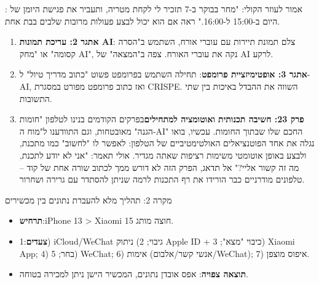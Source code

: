 \begin{tcbpractice}{: אמור לעוזר הקולי: "מחר בבוקר ב-7 תזכיר לי לקחת מטריה, ותעביר את פגישת היומן של היום ב-15:00 ל-16:00." ראה אם הוא יכול לבצע פעולות מרובות שלבים בבת אחת.}
\begin{enumerate}
  \item \textbf{אתגר 2: עריכת תמונות AI}: צלם תמונת תיירות עם עוברי אורח, השתמש ב"הסרה קסומה" או "מחק AI", נקה את עוברי האורח. צפה ב"המצאה" של AI לרקע.
  \item \textbf{אתגר 3: אופטימיזציית פרומפט}: תחילה השתמש בפרומפט פשוט "כתוב מדריך טיול" ל-AI, ואז כתוב פרומפט מפורט במסגרת CRISPE. השווה את ההבדל באיכות בין שתי התשובות.
  \item \textbf{פרק 23: חשיבה תכנותית ואוטומציה למתחילים}בפרקים הקודמים בנינו לטלפון "חומות הגנה" מאובטחות, וגם התוודענו ל"מוח ה-AI" החכם שלו שבתוך החומות. עכשיו, בואו נגלה את אחד הפוטנציאלים האולטימטיביים של הטלפון: לאפשר לו "לחשוב" כמו מתכנת, ולבצע באופן אוטומטי משימות רציפות שאתה מגדיר. אולי תאמר: "אני לא יודע לתכנת, מה זה קשור אליי?" אל תדאג, הפרק הזה לא דורש ממך לכתוב שורה אחת של קוד – טלפונים מודרניים כבר הורידו את רף התכנות לרמה שניתן להסתדר עם גרירה ושחרור.
\end{enumerate}

\end{tcbpractice}

\begin{tcbinfo}{מקרה 2: תהליך מלא להעברת נתונים בין מכשירים}
\begin{itemize}
  \item \textbf{תרחיש}:iPhone 13 > Xiaomi 15 חוצה מותג.
  \item \textbf{צעדים}:1) iCloud/WeChat גיבוי; 2) ניתוק Apple ID + כיבוי "מצא"; 3) Xiaomi App; 4) בחר; 5) WeChat; 6) אימות (אנשי קשר/אלבום/WeChat); 7) איפוס מוצפן.
  \item \textbf{תוצאה צפויה}: אפס אובדן נתונים, המכשיר הישן ניתן למכירה בטוחה.
\end{itemize}

\end{tcbinfo}
